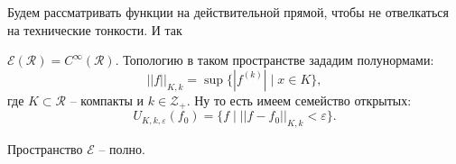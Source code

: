 Будем рассматривать функции на действительной прямой, чтобы не отвелкаться на технические тонкости. И так
\begin{to_def}
	$\mathcal{E}(\mathcal{R}) = C^{\infty}(\mathcal{R})$. Топологию в таком пространстве зададим полунормами:
	\begin{equation*}
		||f||_{K,k} = \sup \{ |f^{(k)}| \mid x \in K\},
	\end{equation*}
	где $K \subset \mathcal{R}$ -- компакты и $k \in \mathcal{Z}_+$. Ну то есть имеем семейство открытых:
	\begin{equation*}
		U_{K,k,\varepsilon} (f_0) = \{f \mid ||f - f_0||_{K,k} < \varepsilon\}.
	\end{equation*}
\end{to_def}

\begin{to_thr}
	Пространство $\mathcal{E}$ -- полно.
\end{to_thr}